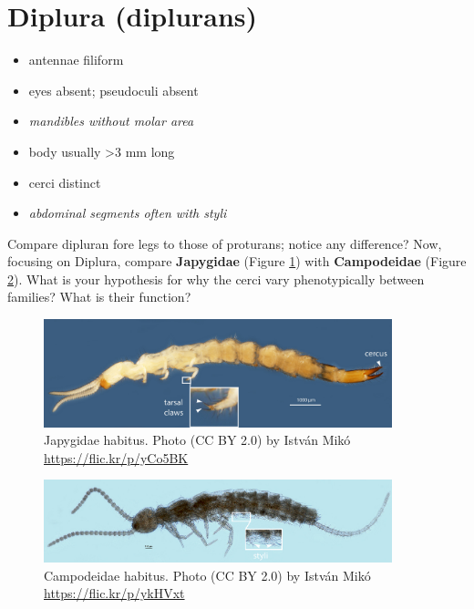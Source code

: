 \documentclass[letterpaper, 11pt]{article}
\begin{document}
\section{Diplura (diplurans)}
\begin{itemize}
\item antennae filiform
\item eyes absent; pseudoculi absent 
\item \textit{mandibles without molar area}
\item body usually \textgreater3 mm long
\item cerci distinct
\item \textit{abdominal segments often with styli}
\end{itemize}

\noindent{}Compare dipluran fore legs to those of proturans; notice any difference? Now, focusing on Diplura, compare \textbf{Japygidae} (Figure \ref{fig:japygidhab}) with \textbf{Campodeidae} (Figure \ref{fig:campodeidhab}). What is your hypothesis for why the cerci vary phenotypically between families? What is their function?\vspace{3cm}

\begin{figure}[ht!]
  \centering
    \includegraphics[width=0.9\textwidth]{japygid1}
  \caption{Japygidae habitus. Photo (CC BY 2.0) by Istv\'an Mik\'o  \url{https://flic.kr/p/yCo5BK}}
  \label{fig:japygidhab}
\end{figure}

\begin{figure}[ht!]
  \centering
    \includegraphics[width=0.9\textwidth]{campodeid1}
  \caption{Campodeidae habitus. Photo (CC BY 2.0) by Istv\'an Mik\'o \url{https://flic.kr/p/ykHVxt}}
  \label{fig:campodeidhab}
\end{figure}
\end{document}
